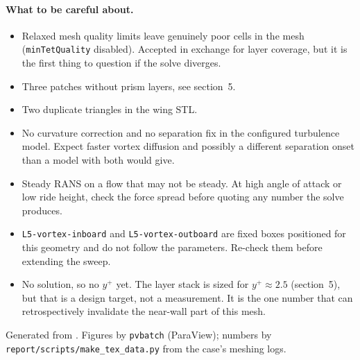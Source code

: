 \documentclass[11pt,a4paper]{article}
\newcommand{\bad}[1]{\textcolor{warn}{#1}}
\begin{document}
\paragraph{What to be careful about.}
\begin{itemize}
\item \bad{Relaxed mesh quality limits} leave genuinely poor cells in the
  mesh (\texttt{minTetQuality} disabled). Accepted in exchange for layer
  coverage, but it is the first thing to question if the solve diverges.
\item \bad{Three patches without prism layers}, see section~5.
\item \bad{Two duplicate triangles} in the wing STL.
\item \bad{No curvature correction and no separation fix} in the configured
  turbulence model. Expect faster vortex diffusion and possibly a different
  separation onset than a model with both would give.
\item \bad{Steady RANS on a flow that may not be steady.} At high angle of
  attack or low ride height, check the force spread before quoting any
  number the solve produces.
\item \texttt{L5-vortex-inboard} and \texttt{L5-vortex-outboard} are
  \bad{fixed boxes positioned for this geometry} and do not follow the
  parameters. Re-check them before extending the sweep.
\item \bad{No solution, so no $y^+$ yet.} The layer stack is sized for
  $y^+\approx 2.5$ (section~5), but that is a design target, not a
  measurement. It is the one number that can retrospectively invalidate the
  near-wall part of this mesh.
\end{itemize}

\vfill
\noindent\footnotesize
Generated from \texttt{\caseName}. Figures by \texttt{pvbatch}
(ParaView); numbers by \texttt{report/scripts/make\_tex\_data.py} from the
case's meshing logs.
\end{document}
